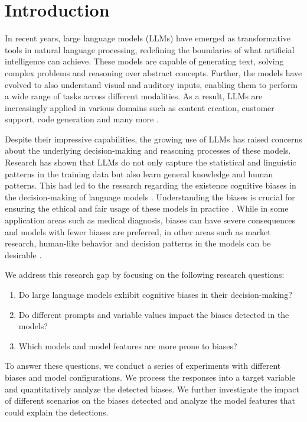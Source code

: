 \section{Introduction}
\par In recent years, large language models (LLMs) have emerged as transformative tools in natural language processing, redefining the boundaries of what artificial intelligence can achieve. These models are capable of generating text, solving complex problems and reasoning over abstract concepts. Further, the models have evolved to also understand visual and auditory inputs, enabling them to perform a wide range of tasks across different modalities. As a result, LLMs are increasingly applied in various domains such as content creation, customer support, code generation and many more \parencite{hadi2024large, naveed2023comprehensive, zhao2023survey}.

\par Despite their impressive capabilities, the growing use of LLMs has raised concerns about the underlying decision-making and reasoning processes of these models. Research has shown that LLMs do not only capture the statistical and linguistic patterns in the training data but also learn general knowledge and human patterns. This had led to the research regarding the existence cognitive biases in the decision-making of language models \parencite{schramowski2022large}. Understanding the biases is crucial for ensuring the ethical and fair usage of these models in practice \parencite{echterhoff2024cognitive}. While in some application areas such as medical diagnosis, biases can have severe consequences and models with fewer biases are preferred, in other areas such as market research, human-like behavior and decision patterns in the models can be desirable \parencite{talboy2023challenging}.

\par We address this research gap by focusing on the following research questions:
\begin{enumerate}[itemsep=0pt, parsep=0pt, topsep=0pt]
    \item Do large language models exhibit cognitive biases in their decision-making?
    \item Do different prompts and variable values impact the biases detected in the models?
    \item Which models and model features are more prone to biases?
\end{enumerate}

\par To answer these questions, we conduct a series of experiments with different biases and model configurations. We process the responses into a target variable and quantitatively analyze the detected biases. We further investigate the impact of different scenarios on the biases detected and analyze the model features that could explain the detections.

